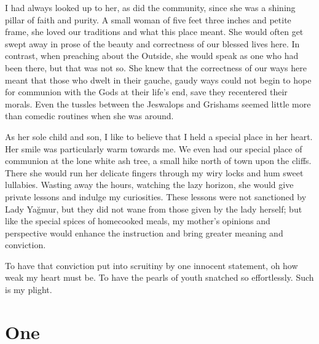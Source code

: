 \documentclass[11pt]{memoir}
\begin{document}
I had always looked up to her, as did the community, since she was a shining pillar of faith and purity. A small woman of five feet three inches and petite frame, she loved our traditions and what this place meant. She would often get swept away in prose of the beauty and correctness of our blessed lives here. In contrast, when preaching about the Outside, she would speak as one who had been there, but that was not so. She knew that the correctness of our ways here meant that those who dwelt in their gauche, gaudy ways could not begin to hope for communion with the Gods at their life's end, save they recentered their morals. Even the tussles between the Jeswalops and Grishams seemed little more than comedic routines when she was around.

As her sole child and son, I like to believe that I held a special place in her heart. Her smile was particularly warm towards me. We even had our special place of communion at the lone white ash tree, a small hike north of town upon the cliffs. There she would run her delicate fingers through my wiry locks and hum sweet lullabies. Wasting away the hours, watching the lazy horizon, she would give private lessons and indulge my curiosities. These lessons were not sanctioned by Lady Yağmur, but they did not wane from those given by the lady herself; but like the special spices of homecooked meals, my mother's opinions and perspective would enhance the instruction and bring greater meaning and conviction.

To have that conviction put into scruitiny by one innocent statement, oh how weak my heart must be. To have the pearls of youth snatched so effortlessly. Such is my plight.

\chapter*{One}
\end{document}
